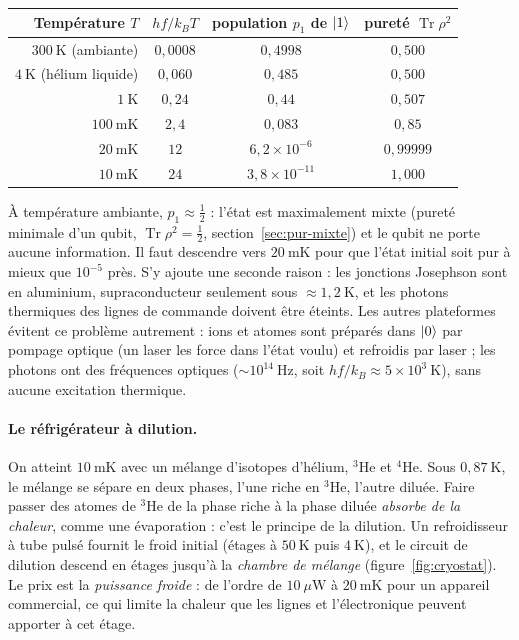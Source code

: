 \begin{center}
\renewcommand{\arraystretch}{1.15}
\begin{tabular}{@{}rccc@{}}
\toprule
Température $T$ & $hf/k_BT$ & population $p_1$ de $|1\rangle$ & pureté $\operatorname{Tr}\rho^2$\\
\midrule
$300\ \mathrm{K}$ (ambiante) & $0{,}0008$ & $0{,}4998$ & $0{,}500$\\
$4\ \mathrm{K}$ (hélium liquide) & $0{,}060$ & $0{,}485$ & $0{,}500$\\
$1\ \mathrm{K}$ & $0{,}24$ & $0{,}44$ & $0{,}507$\\
$100\ \mathrm{mK}$ & $2{,}4$ & $0{,}083$ & $0{,}85$\\
$20\ \mathrm{mK}$ & $12$ & $6{,}2\times10^{-6}$ & $0{,}99999$\\
$10\ \mathrm{mK}$ & $24$ & $3{,}8\times10^{-11}$ & $1{,}000$\\
\bottomrule
\end{tabular}
\end{center}

À température ambiante, $p_1\approx\frac12$ : l'état est maximalement mixte (pureté minimale d'un qubit,
$\operatorname{Tr}\rho^2=\frac12$, section~\ref{sec:pur-mixte}) et le qubit ne porte aucune information. Il faut descendre vers $20\ \mathrm{mK}$ pour que
l'état initial soit pur à mieux que $10^{-5}$ près. S'y ajoute une seconde raison : les jonctions Josephson sont en aluminium, supraconducteur
seulement sous $\approx1{,}2\ \mathrm{K}$, et les photons thermiques des lignes de commande doivent être éteints. Les autres
plateformes évitent ce problème autrement : ions et atomes sont préparés dans $|0\rangle$ par pompage optique (un laser les force dans l'état voulu)
et refroidis par laser ; les photons ont des fréquences optiques ($\sim10^{14}\ \mathrm{Hz}$, soit $hf/k_B\approx5\times10^3\ \mathrm{K}$),
sans aucune excitation thermique.

\paragraph{Le réfrigérateur à dilution.} On atteint $10\ \mathrm{mK}$ avec un mélange d'isotopes d'hélium, $^3$He et $^4$He. Sous
$0{,}87\ \mathrm{K}$, le mélange se sépare en deux phases, l'une riche en $^3$He, l'autre diluée. Faire passer des atomes de $^3$He de
la phase riche à la phase diluée \emph{absorbe de la chaleur}, comme une évaporation : c'est le principe de la dilution. Un
refroidisseur à tube pulsé fournit le froid initial (étages à $50\ \mathrm{K}$ puis $4\ \mathrm{K}$), et le circuit de dilution
descend en étages jusqu'à la \emph{chambre de mélange} (figure~\ref{fig:cryostat}). Le prix est la \emph{puissance
froide} : de l'ordre de $10\ \mu\mathrm{W}$ à $20\ \mathrm{mK}$ pour un appareil commercial, ce qui limite la chaleur que les lignes et
l'électronique peuvent apporter à cet étage.

